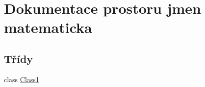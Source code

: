 \hypertarget{namespacematematicka}{}\section{Dokumentace prostoru jmen matematicka}
\label{namespacematematicka}
\subsection*{Třídy}
\begin{DoxyCompactItemize}
\item 
class \hyperlink{classmatematicka_1_1_class1}{Class1}
\end{DoxyCompactItemize}
